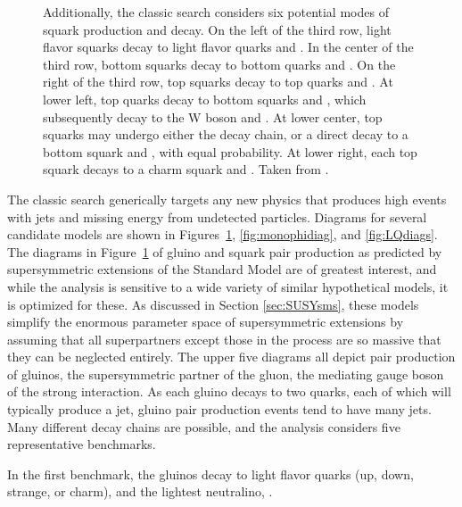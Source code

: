 \begin{figure}[h!]
{Additionally, the classic search considers six potential modes of squark production and decay.
On the left of the third row, light flavor squarks decay to light flavor quarks and \lsp.
In the center of the third row, bottom squarks decay to bottom quarks and \lsp.
On the right of the third row, top squarks decay to top quarks and \lsp.
At lower left, top quarks decay to bottom squarks and \chargino, which subsequently decay to the W boson and \lsp.
At lower center, top squarks may undergo either the \chargino decay chain, or a direct decay to a bottom squark and \lsp, with equal probability.
At lower right, each top squark decays to a charm squark and \lsp.
Taken from \cite{MT2_2019}.}
    \label{fig:susyproduction}
  \end{figure}  

    The classic search generically targets any new physics that produces high \Ht events with jets and missing energy from undetected particles.
    Diagrams for several candidate models are shown in Figures~\ref{fig:susyproduction}, \ref{fig:monophidiag}, and \ref{fig:LQdiags}.
    The diagrams in Figure~\ref{fig:susyproduction} of gluino and squark pair production as predicted by supersymmetric extensions of the Standard Model are of greatest interest, and while the analysis is sensitive to a wide variety of similar hypothetical models, it is optimized for these.
    As discussed in Section \ref{sec:SUSYsms}, these models simplify the enormous parameter space of supersymmetric extensions by assuming that all superpartners except those in the process are so massive that they can be neglected entirely.
    The upper five diagrams all depict pair production of gluinos, the supersymmetric partner of the gluon, the mediating gauge boson of the strong interaction.
    As each gluino decays to two quarks, each of which will typically produce a jet, gluino pair production events tend to have many jets.
    Many different decay chains are possible, and the analysis considers five representative benchmarks.

    In the first benchmark, the gluinos decay to light flavor quarks (up, down, strange, or charm), and the lightest neutralino, \lsp.

